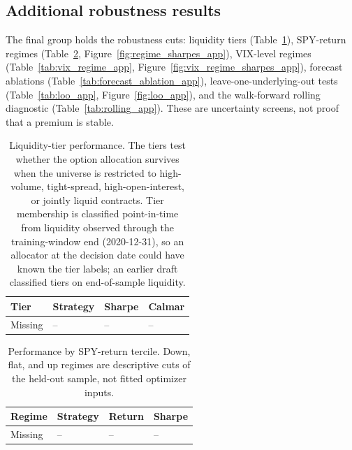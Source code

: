 \subsection{Additional robustness results}

The final group holds the robustness cuts: liquidity tiers
(Table~\ref{tab:liquidity_tiers_app}), SPY-return regimes
(Table~\ref{tab:regime_performance_app}, Figure~\ref{fig:regime_sharpes_app}), VIX-level
regimes (Table~\ref{tab:vix_regime_app}, Figure~\ref{fig:vix_regime_sharpes_app}),
forecast ablations
(Table~\ref{tab:forecast_ablation_app}), leave-one-underlying-out tests
(Table~\ref{tab:loo_app}, Figure~\ref{fig:loo_app}), and the walk-forward rolling
diagnostic (Table~\ref{tab:rolling_app}). These are uncertainty screens, not proof that a
premium is stable.

\begin{table}[H]
\centering
\scriptsize
{}
  {\resizebox{\textwidth}{!}{}}
  {\begin{tabular}{llll}\toprule Tier & Strategy & Sharpe & Calmar \\\midrule Missing & -- & -- & -- \\\bottomrule\end{tabular}}
\caption{Liquidity-tier performance. The tiers test whether the option allocation survives
when the universe is restricted to high-volume, tight-spread, high-open-interest, or jointly
liquid contracts. Tier membership is classified point-in-time from liquidity observed
through the training-window end (2020-12-31), so an allocator at the decision date could
have known the tier labels; an earlier draft classified tiers on end-of-sample liquidity.}
\label{tab:liquidity_tiers_app}
\end{table}

\begin{table}[H]
\centering
\scriptsize
{}
  {\resizebox{\textwidth}{!}{}}
  {\begin{tabular}{llll}\toprule Regime & Strategy & Return & Sharpe \\\midrule Missing & -- & -- & -- \\\bottomrule\end{tabular}}
\caption{Performance by SPY-return tercile. Down, flat, and up regimes are descriptive
cuts of the held-out sample, not fitted optimizer inputs.}
\label{tab:regime_performance_app}
\end{table}

